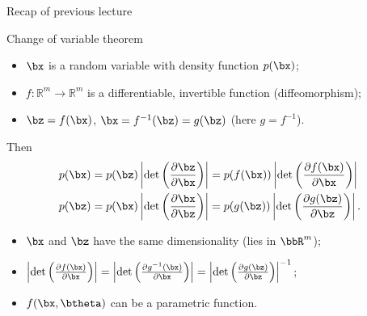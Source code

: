 \begin{frame}{Recap of previous lecture}
	\begin{block}{Change of variable theorem}
		\begin{itemize}
			\item $\bx$ is a random variable with density function $p(\bx)$;
			\item $f: \mathbb{R}^m \rightarrow \mathbb{R}^m$ is a differentiable, invertible function (diffeomorphism);
			\item $\bz = f(\bx)$, $\bx = f^{-1}(\bz) = g(\bz)$ (here $g = f^{-1}$).
		\end{itemize}
		Then
		\vspace{-0.3cm}
		\begin{align*}
			p(\bx) &= p(\bz) \left|\det \left(  \frac{\partial \bz}{\partial \bx} \right) \right| = p(f(\bx)) \left|\det \left(  \frac{\partial f(\bx)}{\partial \bx} \right) \right| \\
			p(\bz) &= p(\bx) \left|\det \left(  \frac{\partial \bx}{\partial \bz} \right) \right| = p(g(\bz)) \left|\det \left(  \frac{\partial g(\bz)}{\partial \bz} \right) \right|.
		\end{align*}
	\end{block}
		\begin{itemize}
			\item $\bx$ and $\bz$ have the same dimensionality (lies in $\bbR^m$);
			\item $ \left|\det \left(  \frac{\partial f(\bx)}{\partial \bx} \right)\right| = \left|\det \left(  \frac{\partial g^{-1}(\bx)}{\partial \bx} \right)\right| = \left|\det \left(  \frac{\partial g(\bz)}{\partial \bz} \right)\right|^{-1}$;
			\item $f(\bx, \btheta)$ can be a parametric function.
		\end{itemize}
\end{frame}

